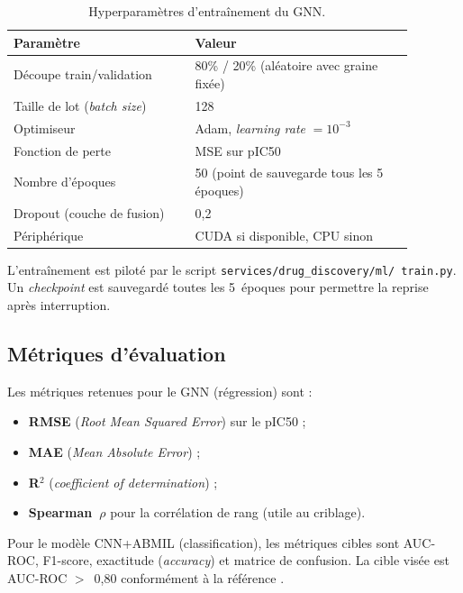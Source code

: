 \documentclass[12pt,a4paper,oneside]{book}
\begin{document}
\begin{table}[H]
\caption{Hyperparamètres d'entraînement du GNN.}
\label{tab:gnn_hp}
\centering
\renewcommand{\arraystretch}{1.3}
\begin{tabular}{L{0.40\linewidth} L{0.48\linewidth}}
\toprule
\textbf{Paramètre} & \textbf{Valeur} \\
\midrule
Découpe train/validation     & 80\% / 20\% (aléatoire avec graine fixée) \\
Taille de lot (\textit{batch size}) & 128 \\
Optimiseur                   & Adam, \textit{learning rate} $=10^{-3}$ \\
Fonction de perte            & MSE sur pIC50 \\
Nombre d'époques             & 50 (point de sauvegarde tous les 5 époques) \\
Dropout (couche de fusion)   & 0,2 \\
Périphérique                 & CUDA si disponible, CPU sinon \\
\bottomrule
\end{tabular}
\end{table}

L'entraînement est piloté par le script \texttt{services/drug\_discovery/ml/
train.py}. Un \textit{checkpoint} est sauvegardé toutes les 5~époques pour
permettre la reprise après interruption.

\subsection{Métriques d'évaluation}

Les métriques retenues pour le GNN (régression) sont :

\begin{itemize}
  \item \textbf{RMSE} (\textit{Root Mean Squared Error}) sur le pIC50 ;
  \item \textbf{MAE} (\textit{Mean Absolute Error}) ;
  \item \textbf{R$^2$} (\textit{coefficient of determination}) ;
  \item \textbf{Spearman~$\rho$} pour la corrélation de rang
    (utile au criblage).
\end{itemize}

Pour le modèle CNN+ABMIL (classification), les métriques cibles sont
AUC-ROC, F1-score, exactitude (\textit{accuracy}) et matrice de confusion.
La cible visée est AUC-ROC $>$~0,80 conformément à la
référence \cite{coudray2018classification}.
\end{document}
